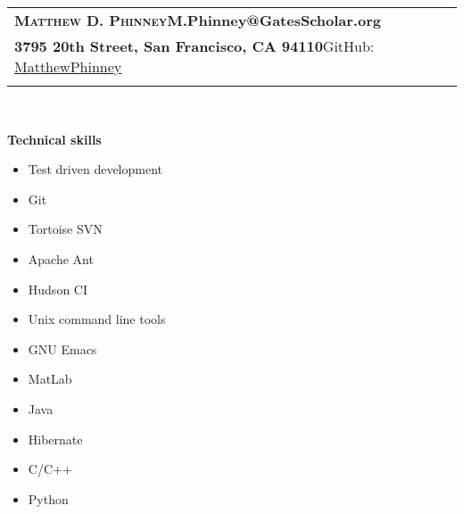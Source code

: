 \documentclass[letterpaper,11pt]{article}
\newcommand{\resitem}[1]{\item #1 \vspace{-1pt}}
\newcommand{\resheading}[1]{{\large \colorbox{mygrey}{\begin{minipage}{\textwidth}{\textbf{#1 \vphantom{p\^{E}}}}\end{minipage}}}}
\begin{document}
\renewcommand{\baselinestretch}{1}
 \normalsize

\newcommand{\mywebheader}{
\begin{tabular*}{7in}{l@{\extracolsep{\fill}}r}
	\textbf{{\Huge \textsc{{Matthew D. Phinney}}}}\hfill{\textbf{{M.Phinney@GatesScholar.org}}}\\
	{\textbf{{3795 20th Street, San Francisco, CA 94110}}}\hfill{GitHub: \href{https://github.com/MatthewPhinney}{MatthewPhinney}} \vspace{0.05in}\\
	\fbox{\parbox{\textwidth}{I am a developer looking to apply my skills to technical, data--driven projects.  My comprehensive knowledge of algorithms and conscientious approach to problem solving allows me to write clean code with superior performance characteristics.  I excel in an environment that fosters creativity, encourages collaboration, and demands polished results, and I look forward to discussing how I might contribute to your team.}}\vspace{0.05in}\\
	\end{tabular*}
\\
\vspace{0.1in}}

\mywebheader


\resheading{\Large{Technical skills}}
\begin{multicols}{3}
	\begin{itemize}
	\large
		\resitem{Test driven development}
		\begin{comment}
		{ \small
				\begin{itemize}
				\renewcommand{\baselinestretch}{1}
				 \small
					{\resitem{Wrote JUnit tests in conjunction with source code and used tests to pinpoint bugs in code written later in the development process}}
				\end{itemize}
		}
		\end{comment}
		\resitem{Git}
		\resitem{Tortoise SVN}
		\resitem{Apache Ant}
		\resitem{Hudson CI}
		\begin{comment}
		{ \small
				\begin{itemize}
				\renewcommand{\baselinestretch}{1}
				 \small
					{\resitem{Reduced deployment time with automated job: build source, copy JARs to staging server, load Coherence Cache, deploy WebLogic application}}
				\end{itemize}
		}
		\end{comment}
		\resitem{Unix command line tools}
		\resitem{GNU Emacs}
		\resitem{MatLab}
		\resitem{Java}
		\resitem{Hibernate}
		\resitem{C/C++}
		\resitem{Python}
	\end{itemize}
\end{multicols}
\end{document}
